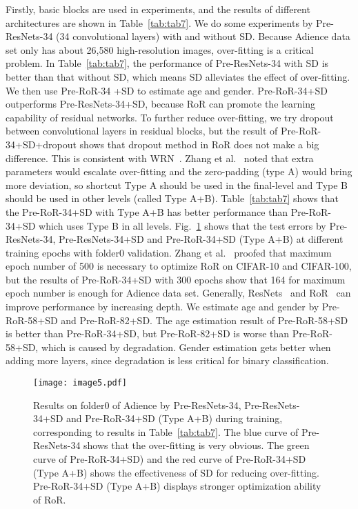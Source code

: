 \documentclass[journal]{IEEEtran}
\begin{document}
Firstly, basic blocks are used in experiments, and the results of different architectures are shown in Table~\ref{tab:tab7}. We do some experiments by Pre-ResNets-34 (34 convolutional layers) with and without SD. Because Adience data set only has about 26,580 high-resolution images, over-fitting is a critical problem. In Table~\ref{tab:tab7}, the performance of Pre-ResNets-34 with SD is better than that without SD, which means SD alleviates the effect of over-fitting. We then use Pre-RoR-34 +SD to estimate age and gender. Pre-RoR-34+SD outperforms Pre-ResNets-34+SD, because RoR can promote the learning capability of residual networks. To further reduce over-fitting, we try dropout between convolutional layers in residual blocks, but the result of Pre-RoR-34+SD+dropout shows that dropout method in RoR does not make a big difference. This is consistent with WRN~\cite{zagoruyko2016wrn}. Zhang et al.~\cite{Ror} noted that extra parameters would escalate over-fitting and the zero-padding (type A) would bring more deviation, so shortcut Type A should be used in the final-level and Type B should be used in other levels (called Type A+B). Table~\ref{tab:tab7} shows that the Pre-RoR-34+SD with Type A+B has better performance than Pre-RoR-34+SD which uses Type B in all levels. Fig.~\ref{fig:image5} shows that the test errors by Pre-ResNets-34, Pre-ResNets-34+SD and Pre-RoR-34+SD (Type A+B) at different training epochs with folder0 validation. Zhang et al.~\cite{Ror} proofed that maximum epoch number of 500 is necessary to optimize RoR on CIFAR-10 and CIFAR-100, but the results of Pre-RoR-34+SD with 300 epochs show that 164 for maximum epoch number is enough for Adience data set. Generally, ResNets~\cite{ResNet} and RoR~\cite{Ror} can improve performance by increasing depth. We estimate age and gender by Pre-RoR-58+SD and Pre-RoR-82+SD. The age estimation result of Pre-RoR-58+SD is better than Pre-RoR-34+SD, but Pre-RoR-82+SD is worse than Pre-RoR-58+SD, which is caused by degradation. Gender estimation gets better when adding more layers, since degradation is less critical for binary classification. 
\begin{figure}
\centering
\texttt{[image: image5.pdf]}
\caption{Results on folder0 of Adience by Pre-ResNets-34, Pre-ResNets-34+SD and Pre-RoR-34+SD (Type A+B) during training, corresponding to results in Table~\ref{tab:tab7}. The blue curve of Pre-ResNets-34 shows that the over-fitting is very obvious. The green curve of Pre-RoR-34+SD) and the red curve of Pre-RoR-34+SD (Type A+B) shows the effectiveness of SD for reducing over-fitting. Pre-RoR-34+SD (Type A+B) displays stronger optimization ability of RoR.}
\label{fig:image5}
\end{figure}
\end{document}
